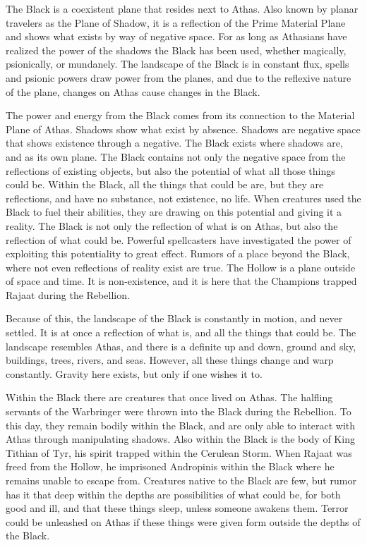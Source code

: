 The Black is a coexistent plane that resides next to Athas. Also known by planar travelers as the Plane of Shadow, it is a reflection of the Prime Material Plane and shows what exists by way of negative space. For as long as Athasians have realized the power of the shadows the Black has been used, whether magically, psionically, or mundanely. The landscape of the Black is in constant flux, spells and psionic powers draw power from the planes, and due to the reflexive nature of the plane, changes on Athas cause changes in the Black.

The power and energy from the Black comes from its connection to the Material Plane of Athas. Shadows show what exist by absence. Shadows are negative space that shows existence through a negative. The Black exists where shadows are, and as its own plane. The Black contains not only the negative space from the reflections of existing objects, but also the potential of what all those things could be. Within the Black, all the things that could be are, but they are reflections, and have no substance, not existence, no life. When creatures used the Black to fuel their abilities, they are drawing on this potential and giving it a reality. The Black is not only the reflection of what is on Athas, but also the reflection of what could be. Powerful spellcasters have investigated the power of exploiting this potentiality to great effect. Rumors of a place beyond the Black, where not even reflections of reality exist are true. The Hollow is a plane outside of space and time. It is non-existence, and it is here that the Champions trapped Rajaat during the Rebellion.

Because of this, the landscape of the Black is constantly in motion, and never settled. It is at once a reflection of what is, and all the things that could be. The landscape resembles Athas, and there is a definite up and down, ground and sky, buildings, trees, rivers, and seas. However, all these things change and warp constantly. Gravity here exists, but only if one wishes it to.

Within the Black there are creatures that once lived on Athas. The halfling servants of the Warbringer were thrown into the Black during the Rebellion. To this day, they remain bodily within the Black, and are only able to interact with Athas through manipulating shadows. Also within the Black is the body of King Tithian of Tyr, his spirit trapped within the Cerulean Storm. When Rajaat was freed from the Hollow, he imprisoned Andropinis within the Black where he remains unable to escape from. Creatures native to the Black are few, but rumor has it that deep within the depths are possibilities of what could be, for both good and ill, and that these things sleep, unless someone awakens them. Terror could be unleashed on Athas if these things were given form outside the depths of the Black.

